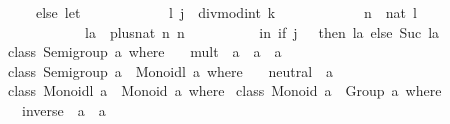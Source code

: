 \begin{isabellebody}
\begin{isamarkuptext}
\ \ \ \ else\ let\ {}\isanewline
\ \ \ \ \ \ \ \ \ \ \ {}l{}\ j{}\ {}\ divmod{}int\ k\ {}{}\isanewline
\ \ \ \ \ \ \ \ \ \ \ n\ {}\ nat\ l{}\isanewline
\ \ \ \ \ \ \ \ \ \ \ la\ {}\ plus{}nat\ n\ n{}\isanewline
\ \ \ \ \ \ \ \ \ {}\ in\ {}if\ j\ {}{}\ {}\ then\ la\ else\ Suc\ la{}{}{}\isanewline
\isanewline
class\ Semigroup\ a\ where\ {}\isanewline
\ \ mult\ {}{}\ a\ {}{}\ a\ {}{}\ a{}\isanewline
{}{}\isanewline
\isanewline
class\ {}Semigroup\ a{}\ {}{}\ Monoidl\ a\ where\ {}\isanewline
\ \ neutral\ {}{}\ a{}\isanewline
{}{}\isanewline
\isanewline
class\ {}Monoidl\ a{}\ {}{}\ Monoid\ a\ where\ {}\isanewline
{}{}\isanewline
\isanewline
class\ {}Monoid\ a{}\ {}{}\ Group\ a\ where\ {}\isanewline
\ \ inverse\ {}{}\ a\ {}{}\ a{}\isanewline

\end{isamarkuptext}
\end{isabellebody}
